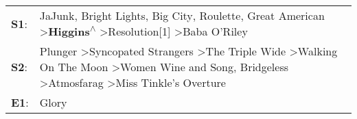\begin{supertabular}{p{0.03\textwidth}p{0.92\textwidth}}
 \textbf{S1}:  &                                                                                         JaJunk\textsuperscript{}, \enspace Bright Lights, Big City\textsuperscript{}, \enspace Roulette\textsuperscript{}, \enspace Great American\textsuperscript{} \textgreater \enspace \textbf{Higgins\textsuperscript{$\wedge$}} \textgreater \enspace Resolution[1]\textsuperscript{} \textgreater \enspace Baba O'Riley\textsuperscript{}  \enspace  \\
 \textbf{S2}:  &  Plunger\textsuperscript{} \textgreater \enspace Syncopated Strangers\textsuperscript{} \textgreater \enspace The Triple Wide\textsuperscript{} \textgreater \enspace Walking On The Moon\textsuperscript{} \textgreater \enspace Women Wine and Song\textsuperscript{}, \enspace Bridgeless\textsuperscript{} \textgreater \enspace Atmosfarag\textsuperscript{} \textgreater \enspace Miss Tinkle's Overture\textsuperscript{}  \enspace  \\
 \textbf{E1}:  &                                                                                                                                                                                                                                                                                                                                                                                                          Glory\textsuperscript{}  \enspace  \\
\end{supertabular}
